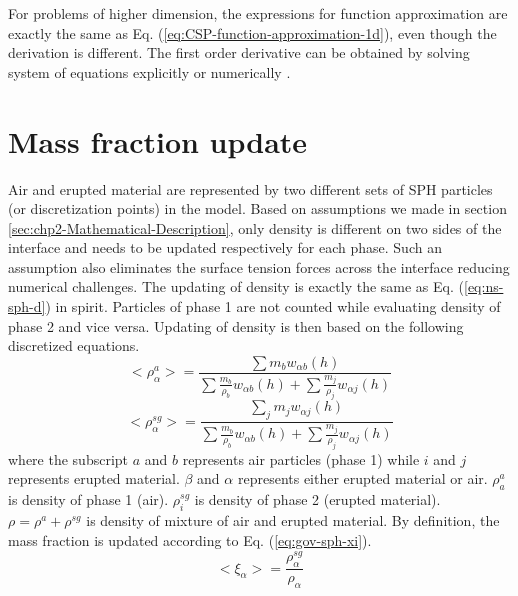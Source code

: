 For problems of higher dimension, the expressions for function approximation are exactly the same as Eq. (\ref{eq:CSP-function-approximation-1d}), even though the derivation is different. The first order derivative can be obtained by solving system of equations explicitly or numerically \citep{chen1999improvement}.

\section{Mass fraction update}
Air and erupted material are represented by two different sets of SPH particles (or discretization points) in the model. Based on assumptions we made in section \ref{sec:chp2-Mathematical-Description}, only density is different on two sides of the interface and needs to be updated respectively for each phase. Such an assumption also eliminates the surface tension forces across the interface reducing numerical challenges. The updating of density is exactly the same as Eq. (\ref{eq:ns-sph-d}) in spirit. Particles of phase 1 are not counted while evaluating density of phase 2 and vice versa. Updating of density is then based on the following discretized equations.
\begin{equation}
<\rho_{\alpha}^a>=\frac{\sum m_b w_{\alpha b} \left(h\right)}{\sum \frac{m_b}{\rho_b} w_{\alpha b} \left(h\right) +\sum \frac{m_j}{\rho_j} w_{\alpha j} \left(h\right)} \label{eq:gov-sph-d1}
\end{equation}
\begin{equation}
<\rho_\alpha^{sg}>=\frac{\sum_j m_j w_{\alpha j} \left(h\right)}{\sum \frac{m_b}{\rho_b} w_{\alpha b} \left(h\right) +\sum \frac{m_j}{\rho_j} w_{\alpha j} \left(h\right)} \label{eq:gov-sph-d2}
\end{equation}
where the subscript $a$ and $b$ represents air particles (phase 1) while $i$ and $j$ represents erupted material. $\beta$ and $\alpha$ represents either erupted material or air.
$\rho_a^a$ is density of phase 1 (air). 
 $\rho_i^{sg}$ is density of phase 2 (erupted material).
$\rho=\rho^a + \rho^{sg}$ is density of mixture of air and erupted material. 
By definition, the mass fraction is updated according to Eq. (\ref{eq:gov-sph-xi}).
\begin{equation}
<\xi_{\alpha}> = \dfrac{\rho^{sg}_{\alpha}}{\rho_{\alpha}}
\label{eq:gov-sph-xi}
\end{equation}

